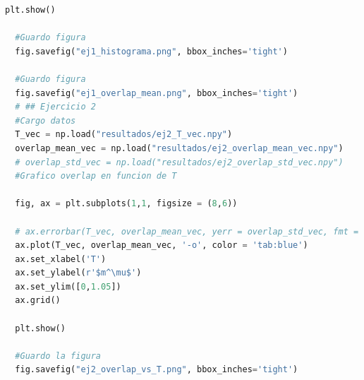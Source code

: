 \documentclass[aps,prb,twocolumn,superscriptaddress,floatfix,longbibliography]{revtex4-2}
\begin{document}
\begin{lstlisting}[language=Python]
  plt.show()
  
  #Guardo figura
  fig.savefig("ej1_histograma.png", bbox_inches='tight')
  
  #Guardo figura
  fig.savefig("ej1_overlap_mean.png", bbox_inches='tight')
  # ## Ejercicio 2
  #Cargo datos
  T_vec = np.load("resultados/ej2_T_vec.npy")
  overlap_mean_vec = np.load("resultados/ej2_overlap_mean_vec.npy")
  # overlap_std_vec = np.load("resultados/ej2_overlap_std_vec.npy")
  #Grafico overlap en funcion de T
  
  fig, ax = plt.subplots(1,1, figsize = (8,6))
  
  # ax.errorbar(T_vec, overlap_mean_vec, yerr = overlap_std_vec, fmt = 'o-', capsize = 5)
  ax.plot(T_vec, overlap_mean_vec, '-o', color = 'tab:blue')
  ax.set_xlabel('T')
  ax.set_ylabel(r'$m^\mu$')
  ax.set_ylim([0,1.05])
  ax.grid()
  
  plt.show()
  
  #Guardo la figura
  fig.savefig("ej2_overlap_vs_T.png", bbox_inches='tight')
  
  
  
  
\end{lstlisting}


\end{document}
